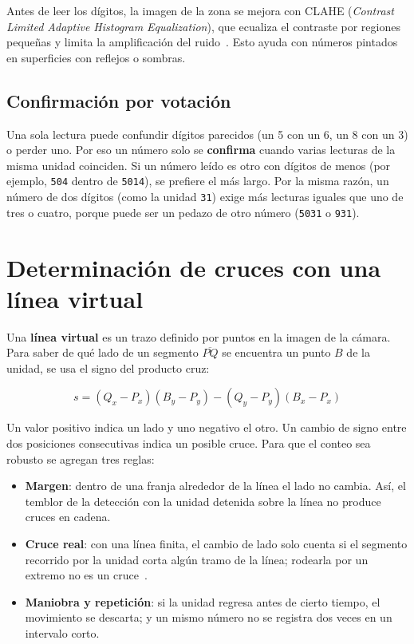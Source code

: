 Antes de leer los dígitos, la imagen de la zona se mejora con CLAHE
(\emph{Contrast Limited Adaptive Histogram Equalization}), que ecualiza el
contraste por regiones pequeñas y limita la amplificación del
ruido~\cite{zuiderveld1994clahe}. Esto ayuda con números pintados en
superficies con reflejos o sombras.

\subsection{Confirmación por votación}

Una sola lectura puede confundir dígitos parecidos (un 5 con un 6, un 8 con
un 3) o perder uno. Por eso un número solo se \textbf{confirma} cuando
varias lecturas de la misma unidad coinciden. Si un número leído es otro
con dígitos de menos (por ejemplo, \texttt{504} dentro de \texttt{5014}), se
prefiere el más largo. Por la misma razón, un número de dos dígitos (como
la unidad \texttt{31}) exige más lecturas iguales que uno de tres o cuatro,
porque puede ser un pedazo de otro número (\texttt{5031} o \texttt{931}).

\section{Determinación de cruces con una línea virtual}

Una \textbf{línea virtual} es un trazo definido por puntos en la imagen de
la cámara. Para saber de qué lado de un segmento $\overline{PQ}$ se
encuentra un punto $B$ de la unidad, se usa el signo del producto cruz:

\begin{equation}
  s = (Q_x - P_x)(B_y - P_y) - (Q_y - P_y)(B_x - P_x)
\end{equation}

Un valor positivo indica un lado y uno negativo el otro. Un cambio de signo
entre dos posiciones consecutivas indica un posible cruce. Para que el
conteo sea robusto se agregan tres reglas:

\begin{itemize}
  \item \textbf{Margen}: dentro de una franja alrededor de la línea el lado
        no cambia. Así, el temblor de la detección con la unidad detenida
        sobre la línea no produce cruces en cadena.
  \item \textbf{Cruce real}: con una línea finita, el cambio de lado solo
        cuenta si el segmento recorrido por la unidad corta algún tramo de
        la línea; rodearla por un extremo no es un cruce~\cite{rep-tecnico}.
  \item \textbf{Maniobra y repetición}: si la unidad regresa antes de cierto
        tiempo, el movimiento se descarta; y un mismo número no se registra
        dos veces en un intervalo corto.
\end{itemize}

